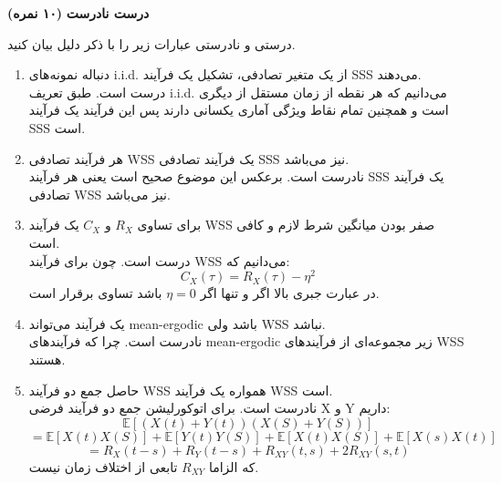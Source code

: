 \Large \textbf{درست نادرست}
\large \textbf{(۱۰ نمره)}

\normalsize \vspace{0.5cm}
درستی و نادرستی عبارات زیر را با ذکر دلیل بیان کنید.
\begin{enumerate}[label=(\alph*)]
	\item
دنباله نمونه‌های i.i.d. از یک متغیر تصادفی، تشکیل یک فرآیند SSS می‌دهند.
	\\
درست است. طبق تعریف i.i.d. می‌دانیم که هر نقطه از زمان مستقل از دیگری است و همچنین تمام نقاط ویژگی آماری یکسانی دارند پس این فرآیند یک فرآیند SSS است.
	\item
هر فرآیند تصادفی WSS یک فرآیند تصادفی SSS نیز می‌باشد.
	\\
نادرست است. برعکس این موضوع صحیح است یعنی هر فرآیند SSS یک فرآیند تصادفی WSS نیز می‌باشد.
	\item
 برای تساوی 
$ R_X $
 و
$ C_X $
 یک فرآیند WSS صفر بودن میانگین شرط لازم و کافی است.
 	\\
 درست است. چون برای فرآیند WSS می‌دانیم که:
$$
C_X(\tau) = R_X(\tau) - \eta^2
$$
در عبارت جبری بالا اگر و تنها اگر 
$ \eta = 0 $
باشد تساوی برقرار است.

	\item
یک فرآیند می‌تواند mean-ergodic باشد ولی WSS نباشد.
	\\
نادرست است. چرا که فرآیند‌های mean-ergodic زیر مجموعه‌ای از فرآیند‌های WSS هستند.
	\item
حاصل جمع دو فرآیند WSS همواره یک فرآیند WSS است.
	\\
نادرست است. برای اتوکورلیشن جمع دو فرآیند فرضی X و Y داریم:
$$
\mathbb{E}[(X(t) + Y(t))(X(S) + Y(S))] 
$$
$$
= \mathbb{E}[X(t)X(S)] + \mathbb{E}[Y(t)Y(S)] + \mathbb{E}[X(t)X(S)] + \mathbb{E}[X(s)X(t)]
$$
$$
= R_{X} (t-s) + R_Y(t-s) + R_{XY} (t,s) + 2R_{XY} (s,t) 
$$
که الزاما
$ R_{XY} $
تابعی از اختلاف زمان نیست.
\end{enumerate}
